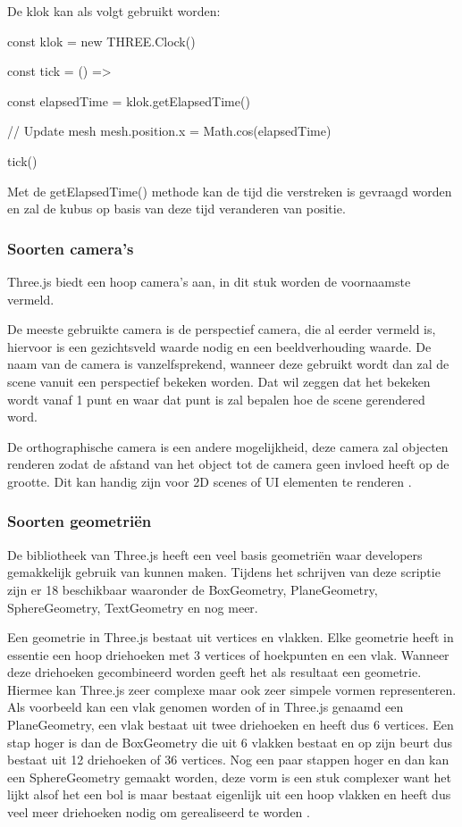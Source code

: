 De klok kan als volgt gebruikt worden:

\begin{LVerbatim}
const klok = new THREE.Clock()

const tick = () =>
{
	const elapsedTime = klok.getElapsedTime()
	
	// Update mesh
	mesh.position.x = Math.cos(elapsedTime)
}

tick()
\end{LVerbatim}

Met de getElapsedTime() methode kan de tijd die verstreken is gevraagd worden en zal de kubus op basis van deze tijd veranderen van positie. 

\subsubsection{Soorten camera's}

Three.js biedt een hoop camera's aan, in dit stuk worden de voornaamste vermeld.

De meeste gebruikte camera is de perspectief camera, die al eerder vermeld is, hiervoor is een gezichtsveld waarde nodig en een beeldverhouding waarde. De naam van de camera is vanzelfsprekend, wanneer deze gebruikt wordt dan zal de scene vanuit een perspectief bekeken worden. Dat wil zeggen dat het bekeken wordt vanaf 1 punt en waar dat punt is zal bepalen hoe de scene gerendered word.

De orthographische camera is een andere mogelijkheid, deze camera zal objecten renderen zodat de afstand van het object tot de camera geen invloed heeft op de grootte. Dit kan handig zijn voor 2D scenes of UI elementen te renderen \autocite{threejs2023}.

\subsubsection{Soorten geometriën}

De bibliotheek van Three.js heeft een veel basis geometriën waar developers gemakkelijk gebruik van kunnen maken. Tijdens het schrijven van deze scriptie zijn er 18 beschikbaar waaronder de BoxGeometry, PlaneGeometry, SphereGeometry, TextGeometry en nog meer.

Een geometrie in Three.js bestaat uit vertices en vlakken. Elke geometrie heeft in essentie een hoop driehoeken met 3 vertices of hoekpunten en een vlak. Wanneer deze driehoeken gecombineerd worden geeft het als resultaat een geometrie. Hiermee kan Three.js zeer complexe maar ook zeer simpele vormen representeren. Als voorbeeld kan een vlak genomen worden of in Three.js genaamd een PlaneGeometry, een vlak bestaat uit twee driehoeken en heeft dus 6 vertices. Een stap hoger is dan de BoxGeometry die uit 6 vlakken bestaat en op zijn beurt dus bestaat uit 12 driehoeken of 36 vertices. Nog een paar stappen hoger en dan kan een SphereGeometry gemaakt worden, deze vorm is een stuk complexer want het lijkt alsof het een bol is maar bestaat eigenlijk uit een hoop vlakken en heeft dus veel meer driehoeken nodig om gerealiseerd te worden  \autocite{threejs2023}.


